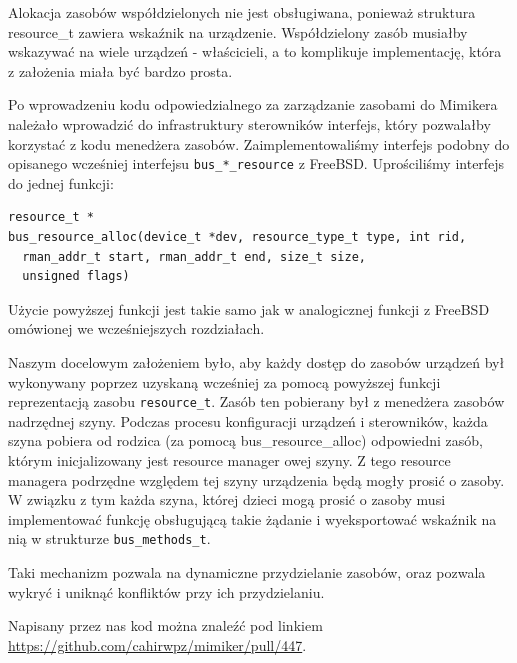 \documentclass[shortabstract,inz]{iithesis}
\begin{document}
Alokacja zasobów współdzielonych nie jest obsługiwana, ponieważ struktura resource\_t zawiera 
wskaźnik na urządzenie. Współdzielony zasób musiałby wskazywać na wiele urządzeń - właścicieli, a to 
komplikuje implementację, która z założenia miała być bardzo prosta. 

Po wprowadzeniu kodu odpowiedzialnego za zarządzanie zasobami do Mimikera
należało wprowadzić do infrastruktury sterowników interfejs, który pozwalałby korzystać z kodu menedżera zasobów.
Zaimplementowaliśmy interfejs podobny do opisanego wcześniej interfejsu \texttt{bus\_*\_resource} 
z FreeBSD.
Uprościliśmy interfejs do jednej funkcji:
\begin{lstlisting}
resource_t *
bus_resource_alloc(device_t *dev, resource_type_t type, int rid,
  rman_addr_t start, rman_addr_t end, size_t size, 
  unsigned flags)
\end{lstlisting}

Użycie powyższej funkcji jest takie samo jak w analogicznej funkcji z FreeBSD omówionej we wcześniejszych
rozdziałach.

Naszym docelowym założeniem było, aby każdy dostęp do zasobów urządzeń był wykonywany poprzez
uzyskaną wcześniej za pomocą powyższej funkcji reprezentacją zasobu \texttt{resource\_t}.
Zasób ten pobierany był z menedżera zasobów nadrzędnej szyny. Podczas procesu konfiguracji
urządzeń i sterowników, każda szyna pobiera od rodzica (za pomocą bus\_resource\_alloc) 
odpowiedni zasób, którym inicjalizowany jest resource manager owej szyny. Z tego resource managera podrzędne
względem tej szyny urządzenia będą mogły prosić o zasoby. W związku z tym każda szyna,
której dzieci mogą prosić o zasoby musi implementować funkcję obsługującą takie żądanie i 
wyeksportować wskaźnik na nią w strukturze \texttt{bus\_methods\_t}.

Taki mechanizm pozwala na dynamiczne przydzielanie zasobów, oraz pozwala wykryć i uniknąć konfliktów 
przy ich przydzielaniu.

Napisany przez nas kod można znaleźć pod linkiem \url{https://github.com/cahirwpz/mimiker/pull/447}.
\end{document}

